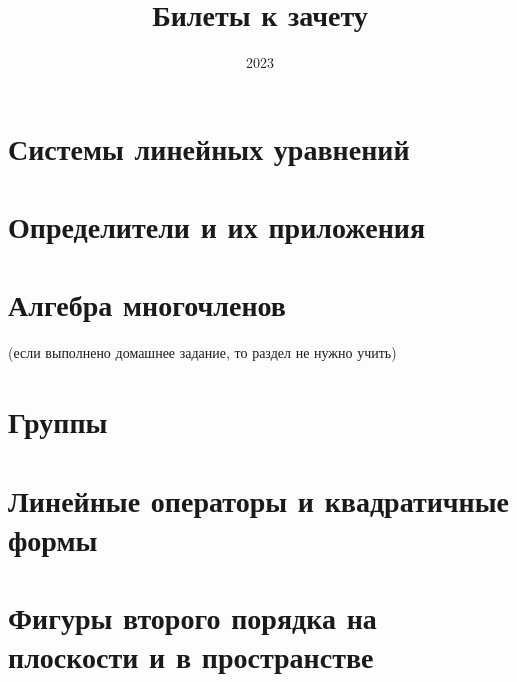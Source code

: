\documentclass{Exams}
\author{}
\title{Билеты к зачету}
\date{2023}
\begin{document}
\subject{Алгем}
\ExamMakeTitle
\section*{Системы линейных уравнений}


\section*{Определители и их приложения}


\section*{Алгебра многочленов}
(если выполнено домашнее задание, то раздел не нужно учить)


\section*{Группы}


\section*{Линейные операторы и квадратичные формы}


\section*{Фигуры второго порядка на плоскости и в пространстве}

\end{document}
